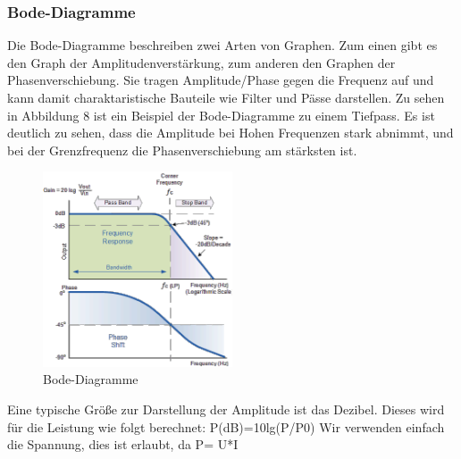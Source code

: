 \subsubsection{Bode-Diagramme}
Die Bode-Diagramme beschreiben zwei Arten von Graphen. Zum einen gibt es den Graph der Amplitudenverstärkung, zum anderen den Graphen der Phasenverschiebung. Sie tragen Amplitude/Phase gegen die Frequenz auf und kann damit charaktaristische Bauteile wie Filter und Pässe darstellen. Zu sehen in Abbildung 8 ist ein Beispiel der Bode-Diagramme zu einem Tiefpass. Es ist deutlich zu sehen, dass die Amplitude bei Hohen Frequenzen stark abnimmt, und bei der Grenzfrequenz die Phasenverschiebung am stärksten ist.
\begin{figure}[H]
    \centering
    \includegraphics[width=0.5\textwidth]{Abb/bode.pdf}
    \caption{Bode-Diagramme} 
\end{figure}

Eine typische Größe zur Darstellung der Amplitude ist das Dezibel. Dieses wird für die Leistung wie folgt berechnet:
P(dB)=10lg(P/P0)
Wir verwenden einfach die Spannung, dies ist erlaubt, da P= U*I

